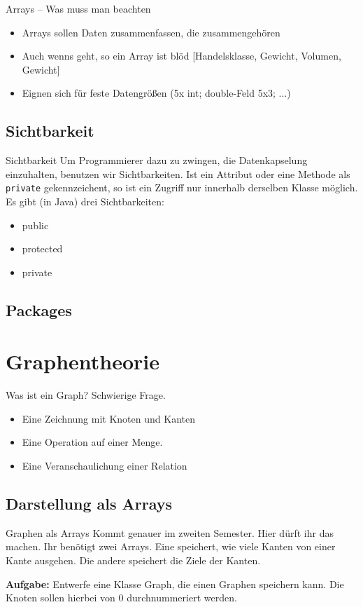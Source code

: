 \documentclass[18pt]{beamer}
\begin{document}
\begin{frame}{Arrays – Was muss man beachten}
 \begin{itemize}
  \item Arrays sollen Daten zusammenfassen, die zusammengehören
  \item Auch wenns geht, so ein Array ist blöd [Handelsklasse, Gewicht, Volumen, Gewicht]
  \item Eignen sich für feste Datengrößen (5x int; double-Feld 5x3; ...)
 \end{itemize}

\end{frame}

\subsection{Sichtbarkeit}
\begin{frame}[fragile]{Sichtbarkeit}
 Um Programmierer dazu zu zwingen, die Datenkapselung einzuhalten,
 benutzen wir Sichtbarkeiten. Ist ein Attribut oder eine Methode als 
 \verb|private| gekennzeichent, so ist ein Zugriff nur innerhalb
 derselben Klasse möglich.
 Es gibt (in Java) drei Sichtbarkeiten:
 \begin{itemize}
  \item public
  \item protected
  \item private
 \end{itemize}
\end{frame}

\subsection{Packages}
\section{Graphentheorie}
\begin{frame}{Was ist ein Graph?}
 Schwierige Frage.
 \begin{itemize}
  \item Eine Zeichnung mit Knoten und Kanten 
  \item Eine Operation auf einer Menge. 
  \item Eine Veranschaulichung einer Relation 
 \end{itemize}
\end{frame}

\subsection{Darstellung als Arrays}
\begin{frame}{Graphen als Arrays}
Kommt genauer im zweiten Semester. Hier dürft ihr das machen.
Ihr benötigt zwei Arrays. Eine speichert, wie viele Kanten von einer
Kante ausgehen. Die andere speichert die Ziele der Kanten.

\textbf{Aufgabe:} Entwerfe eine Klasse Graph, die einen Graphen speichern
kann. Die Knoten sollen hierbei von 0 durchnummeriert werden.
\end{frame}
\end{document}
